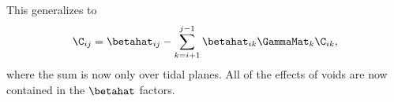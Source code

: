 This generalizes to 
\begin{equation}
\C_{i j} = \betahat_{i j} - \sum\limits_{k = i +1}^{j - 1} \betahat_{i k} \GammaMat_k \C_{i k},
\end{equation}
where the sum is now only over tidal planes. All of the effects of voids are now contained in the $\betahat$ factors. 
  
  